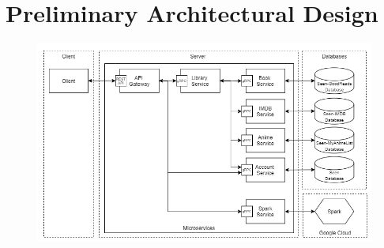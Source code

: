 \documentclass{article}
\begin{document}
\section{Preliminary Architectural Design}
  \begin{figure}[H]
    \centering
    \includegraphics[width=\textwidth]{"images/CloudNativeAppArchitecture.png"}
  \end{figure}
\end{document}
